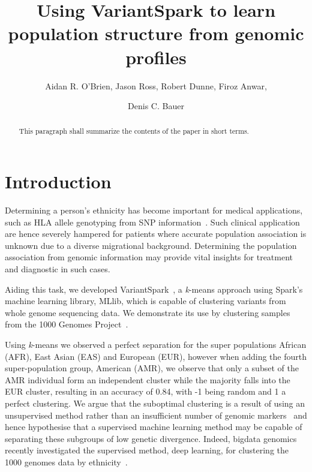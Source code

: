 \documentclass{llncs}
\newcommand{\variantSpark}{{\sc VariantSpark}}
\newcommand{\kMeans}{\textit{k}-means}
\begin{document}
\setcounter{save}{\value{section}}
{\def\addtocontents#1#2{}%
\def\addcontentsline#1#2#3{}%
\def\markboth#1#2{}%
%
\title{Using VariantSpark to learn population structure from genomic profiles}

\author{Aidan R. O'Brien, Jason Ross, Robert Dunne, Firoz Anwar, \and Denis C. Bauer}


\maketitle
%
\begin{abstract}
This paragraph shall summarize the contents of the paper
in short terms.
\end{abstract}
%
\section{Introduction}
%

Determining a person's ethnicity has become important for medical applications, such as HLA allele genotyping from SNP information~\cite{Zheng2014}. Such clinical application are hence severely hampered for patients where accurate population association is unknown due to a diverse migrational background. Determining the population association from genomic information may provide vital insights for treatment and diagnostic in such cases. 

Aiding this task, we developed \variantSpark~\cite{OBrien}, a \kMeans{} approach using {\sc Spark}'s machine learning library, {\sc MLlib}, which is capable of clustering variants from whole genome sequencing data. 
We demonstrate its use by clustering samples from the 1000 Genomes Project~\cite{1KG2012}.

Using \kMeans{} we observed a perfect separation for the super populations African (AFR), East Asian (EAS) and European (EUR), however when adding the fourth super-population group, American (AMR), we observe that only a subset of the AMR individual form an independent cluster while the majority falls into the EUR cluster, resulting in an accuracy of 0.84, with -1 being random and 1 a perfect clustering.
We argue that the suboptimal clustering is a result of using an unsupervised method rather than an insufficient number of genomic markers~\cite{Patterson2006} and hence hypothesise that a supervised machine learning method may be capable of separating these subgroups of low genetic divergence.  
Indeed, bigdata genomics recently investigated the supervised method, deep learning, for clustering the 1000 genomes data by ethnicity~\cite{Ferguson}. 

}
\end{document}
